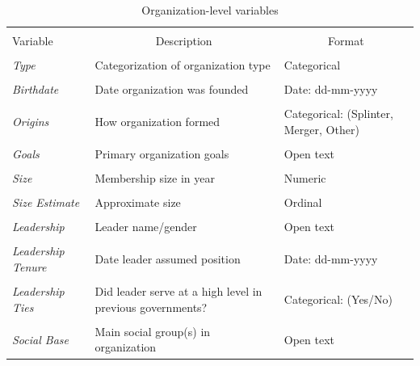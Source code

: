 \begin{table}[!htbp] \centering 
  \caption{Organization-level variables} 
  \label{Tab: Table 1} 
\begin{tabular}{p{3cm} p{6cm} p{5cm}} 
\\[-1.8ex]\hline 
\hline \\[-1.8ex] 
Variable & \multicolumn{1}{c}{Description} & \multicolumn{1}{c}{Format} \\
\hline \\[-1.8ex] 
\emph{Type}                     &     Categorization of organization type                                   & Categorical  \\ 
\hline \\[-1.8ex] 
\emph{Birthdate}               &     Date organization was founded                                     & Date: dd-mm-yyyy \\ 
\hline \\[-1.8ex] 
\emph{Origins}                  &     How organization formed                                         & Categorical: (Splinter, Merger, Other) \\ 
\hline \\[-1.8ex] 
\emph{Goals}                    &     Primary organization goals                                            & Open text \\ 
\hline \\[-1.8ex] 
\emph{Size}                     &     Membership size in year                                         & Numeric \\ 
\hline \\[-1.8ex] 
\emph{Size Estimate}            &     Approximate size                                                      & Ordinal \\ 
\hline \\[-1.8ex] 
\emph{Leadership}               &     Leader name/gender                                             & Open text \\ 
\hline \\[-1.8ex] 
\emph{Leadership Tenure}        &     Date leader assumed position                                     & Date: dd-mm-yyyy \\ 
\hline \\[-1.8ex] 
\emph{Leadership Ties}          &     Did leader serve at a high level in previous governments?         & Categorical: (Yes/No) \\ 
\hline \\[-1.8ex] 
\emph{Social Base}              &     Main social group(s) in organization                 & Open text \\ 

\end{tabular}
\end{table}

